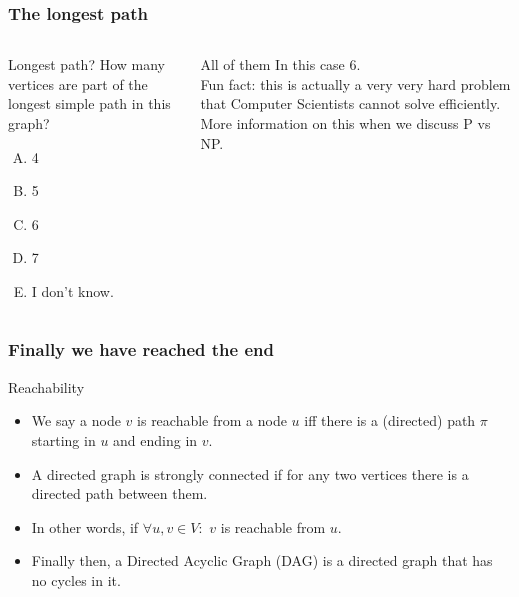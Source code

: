 \begin{frame}
	\frametitle{The longest path}
	\begin{columns}
			
		\begin{questionblock}{Longest path?}
		\pause
			How many vertices are part of the longest simple path in this graph?
			\begin{enumerate}[A.]
				\item 4
				\item 5 
				\item 6
				\item 7
				\item I don't know.
			\end{enumerate}
		\end{questionblock}
		\pause
		\vspace{-10pt}
		\begin{answerblock}{All of them}
			In this case 6. \\
			Fun fact: this is actually a \alert{very very hard problem} that Computer Scientists cannot solve efficiently. More
			information on this when we discuss P vs NP.
		\end{answerblock}
	\end{columns}
\end{frame}

\begin{frame}
	\frametitle{Finally we have reached the end}

		\begin{block}{Reachability}
			\begin{itemize}
				\item We say a node $v$ is \alert{reachable} from a node $u$ iff there is a (directed) path $\pi$ starting in
					$u$ and ending in $v$.
					\pause
				\item A directed graph is \alert{strongly connected} if for any two vertices there is a directed path between them.
				\item In other words, if $\forall u,v \in V:$ $v$ is reachable from $u$.
					\pause
				\item Finally then, a \alert{Directed Acyclic Graph (DAG)}  is a directed graph that has no cycles in it.
			\end{itemize}
		\end{block}	
\end{frame}

